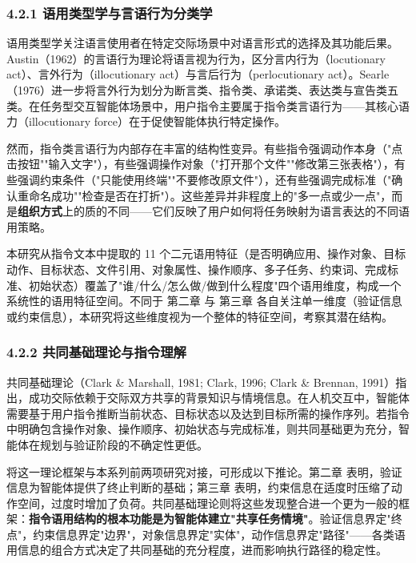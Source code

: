 \documentclass[12pt,a4paper,openany,oneside]{ctexrep}
\begin{document}
\subsubsection{4.2.1 语用类型学与言语行为分类学}


语用类型学关注语言使用者在特定交际场景中对语言形式的选择及其功能后果。Austin（1962）的言语行为理论将语言视为行为，区分言内行为（locutionary act）、言外行为（illocutionary act）与言后行为（perlocutionary act）。Searle（1976）进一步将言外行为划分为断言类、指令类、承诺类、表达类与宣告类五类。在任务型交互智能体场景中，用户指令主要属于指令类言语行为——其核心语力（illocutionary force）在于促使智能体执行特定操作。

然而，指令类言语行为内部存在丰富的结构性变异。有些指令强调动作本身（"点击按钮""输入文字"），有些强调操作对象（"打开那个文件""修改第三张表格"），有些强调约束条件（"只能使用终端""不要修改原文件"），还有些强调完成标准（"确认重命名成功""检查是否在打折"）。这些差异并非程度上的"多一点或少一点"，而是\textbf{组织方式}上的质的不同——它们反映了用户如何将任务映射为语言表达的不同语用策略。

本研究从指令文本中提取的 11 个二元语用特征（是否明确应用、操作对象、目标动作、目标状态、文件引用、对象属性、操作顺序、多子任务、约束词、完成标准、初始状态）覆盖了"谁/什么/怎么做/做到什么程度"四个语用维度，构成一个系统性的语用特征空间。不同于 第二章 与 第三章 各自关注单一维度（验证信息或约束信息），本研究将这些维度视为一个整体的特征空间，考察其潜在结构。

\subsubsection{4.2.2 共同基础理论与指令理解}


共同基础理论（Clark \& Marshall, 1981; Clark, 1996; Clark \& Brennan, 1991）指出，成功交际依赖于交际双方共享的背景知识与情境信息。在人机交互中，智能体需要基于用户指令推断当前状态、目标状态以及达到目标所需的操作序列。若指令中明确包含操作对象、操作顺序、初始状态与完成标准，则共同基础更为充分，智能体在规划与验证阶段的不确定性更低。

将这一理论框架与本系列前两项研究对接，可形成以下推论。第二章 表明，验证信息为智能体提供了终止判断的基础；第三章 表明，约束信息在适度时压缩了动作空间，过度时增加了负荷。共同基础理论则将这些发现整合进一个更为一般的框架：\textbf{指令语用结构的根本功能是为智能体建立"共享任务情境"}。验证信息界定"终点"，约束信息界定"边界"，对象信息界定"实体"，动作信息界定"路径"——各类语用信息的组合方式决定了共同基础的充分程度，进而影响执行路径的稳定性。
\end{document}
